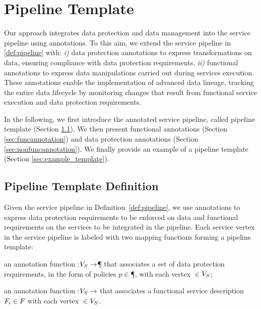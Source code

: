 \section{Pipeline Template}\label{sec:template}
Our approach integrates data protection and data management into the service pipeline using annotations.
To this aim, we extend the service pipeline in \cref{def:pipeline} with: \emph{i)} data protection annotations to express transformations on data, ensuring compliance with data protection requirements, \emph{ii)} functional annotations to express data manipulations carried out during services execution.
These annotations enable the implementation of advanced data lineage, tracking the entire data lifecycle by monitoring changes that result from functional service execution and data protection requirements.

In the following, we first introduce the annotated service pipeline, called pipeline template (Section \ref{sec:templatedefinition}). We then present functional annotations (Section \ref{sec:funcannotation}) and data protection annotations (Section \ref{sec:nonfuncannotation}). We finally provide an example of a pipeline template (Section \ref{sec:example_template}).


\subsection{Pipeline Template Definition}\label{sec:templatedefinition}
Given the service pipeline in Definition~\ref{def:pipeline}, we use annotations to express data protection requirements to be enforced on data and functional requirements on the services to be integrated in the pipeline. Each service vertex in the service pipeline is labeled with two mapping functions forming a pipeline template:
\begin{enumerate*}[label=\textit{\roman*})]
  \item an annotation function \myLambda:$V_S\rightarrow$\P{} that associates a set of data protection requirements, in the form of policies $p$$\in$\P{}, with each vertex $\in$$V_S$;
  \item an annotation function \myGamma:$V_S\rightarrow$\F{} that associates a functional service description $F_i\in F_{}$ with each vertex $\in$$V_S$.
\end{enumerate*}

